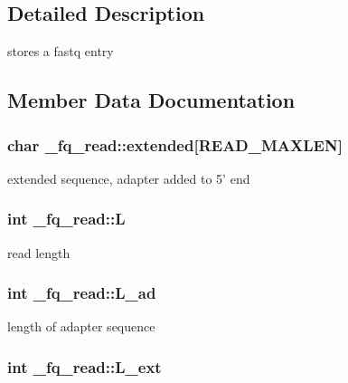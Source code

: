 \subsection{Detailed Description}
stores a fastq entry 

\subsection{Member Data Documentation}
\hypertarget{struct__fq__read_aae3ecb937cbba51f91baa391d8d84826}{
\subsubsection[{extended}]{\setlength{\rightskip}{0pt plus 5cm}char \+\_\+fq\+\_\+read\+::extended\mbox{[}R\+E\+A\+D\+\_\+\+M\+A\+X\+L\+E\+N\mbox{]}}}\label{struct__fq__read_aae3ecb937cbba51f91baa391d8d84826}
extended sequence, adapter added to 5' end \hypertarget{struct__fq__read_a746efa9093b5223e85ffb7274e7693ef}{
\subsubsection[{L}]{\setlength{\rightskip}{0pt plus 5cm}int \+\_\+fq\+\_\+read\+::\+L}}\label{struct__fq__read_a746efa9093b5223e85ffb7274e7693ef}
read length \hypertarget{struct__fq__read_a61c338fcae059e8581b02ec1b2cdcdc6}{
\subsubsection[{L\+\_\+ad}]{\setlength{\rightskip}{0pt plus 5cm}int \+\_\+fq\+\_\+read\+::\+L\+\_\+ad}}\label{struct__fq__read_a61c338fcae059e8581b02ec1b2cdcdc6}
length of adapter sequence \hypertarget{struct__fq__read_acf9a80768c42f71a975d602058e2ab52}{
\subsubsection[{L\+\_\+ext}]{\setlength{\rightskip}{0pt plus 5cm}int \+\_\+fq\+\_\+read\+::\+L\+\_\+ext}}\label{struct__fq__read_acf9a80768c42f71a975d602058e2ab52}
